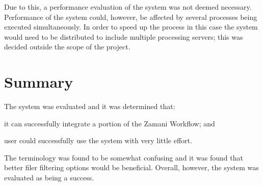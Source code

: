 Due to this, a performance evaluation of the system was not deemed necessary.
Performance of the system could, however, be affected by several processes being
executed simultaneously. In order to speed up the process in this case the
system would need to be distributed to include multiple processing servers; this
was decided outside the scope of the project.

\section{Summary}

The system was evaluated and it was determined that: \begin{inparaenum}[(i)] \item
it can successfully integrate a portion of the Zamani Workflow; and \item user could
successfully use the system with very little effort.\end{inparaenum} The terminology was found
to be somewhat confusing and it was found that better filer filtering options would be
beneficial. Overall, however, the system was evaluated as being a success.

